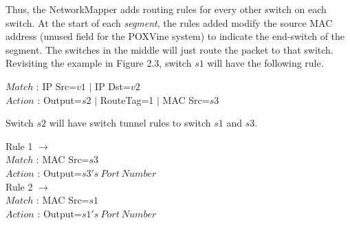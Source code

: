 Thus, the NetworkMapper adds routing rules for every other switch on each switch. At the start of each \emph{segment}, the rules added modify the source MAC address (unused field for the POXVine system) to indicate the end-switch of the segment. The switches in the middle will just route the packet to that switch. Revisiting the example in Figure 2.3, switch $s1$ will have the following rule. 
\begin{center}
	$Match$ : IP Src=$v1$ $|$ IP Dst=$v2$ \\
	$Action$ : Output=$s2$ $|$ RouteTag=1 $|$ MAC Src=$s3$\\
\end{center}

Switch $s2$ will have switch tunnel rules to switch $s1$ and $s3$. 
\begin{center}
	Rule 1 $\rightarrow$\\
	$Match$ : MAC Src=$s3$ \\
	$Action$ : Output=$s3's\ Port\ Number$ \\
	Rule 2 $\rightarrow$\\
	$Match$ : MAC Src=$s1$ \\
	$Action$ : Output=$s1's\ Port\ Number$ \\	
\end{center}







 

